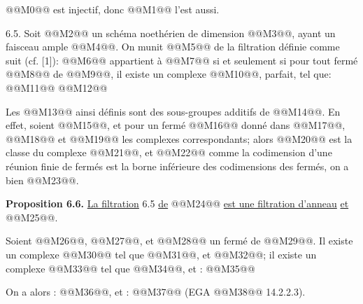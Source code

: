
@@M0@@
est
injectif, donc @@M1@@ l'est aussi.

6.5. Soit @@M2@@ un schéma noethérien de dimension @@M3@@, ayant un faisceau ample @@M4@@. On munit @@M5@@ de la filtration définie comme suit (cf. [1]): @@M6@@ appartient à @@M7@@ si et seulement si pour tout fermé @@M8@@ de @@M9@@, il existe un complexe @@M10@@, parfait, tel que:
@@M11@@
@@M12@@

Les @@M13@@ ainsi définis sont des sous-groupes additifs de @@M14@@. En effet, soient @@M15@@, et pour un fermé @@M16@@ donné dans @@M17@@, @@M18@@ et @@M19@@ les complexes correspondants; alors @@M20@@ est la classe du complexe @@M21@@, et
@@M22@@
comme la codimension d'une réunion finie de fermés est la borne inférieure des codimensions des fermés, on a bien @@M23@@.

\textbf{Proposition 6.6.} \uline{La filtration} 6.5 \uline{de} @@M24@@ \uline{est une filtration d'anneau} \uline{et} @@M25@@.

Soient @@M26@@, @@M27@@, et @@M28@@ un fermé de @@M29@@. Il existe un complexe @@M30@@ tel que @@M31@@, et @@M32@@; il existe un complexe @@M33@@ tel que @@M34@@, et :
@@M35@@

On a alors : @@M36@@, et :
@@M37@@
(EGA @@M38@@ 14.2.2.3).
